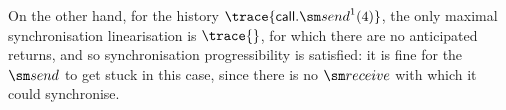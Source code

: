 On the other hand, for the history $\trace{\call.\send^1(4)}$, the only
maximal synchronisation linearisation is $\trace{}$, for which there are no
anticipated returns, and so synchronisation progressibility is satisfied: it
is fine for the $\send$ to get stuck in this case, since there is no
$\receive$ with which it could synchronise.







